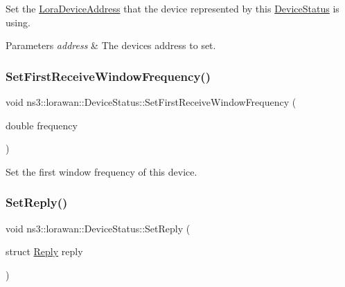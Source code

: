 Set the \hyperlink{classns3_1_1lorawan_1_1LoraDeviceAddress}{Lora\+Device\+Address} that the device represented by this \hyperlink{classns3_1_1lorawan_1_1DeviceStatus}{Device\+Status} is using.


\begin{DoxyParams}{Parameters}
{\em address} & The device\textquotesingle{}s address to set. \\
\hline
\end{DoxyParams}
\mbox{\label{classns3_1_1lorawan_1_1DeviceStatus_a27f4dfe68d8361e4835c50865aaf7325}} 
\subsubsection{\texorpdfstring{Set\+First\+Receive\+Window\+Frequency()}{SetFirstReceiveWindowFrequency()}}
{\footnotesize\ttfamily void ns3\+::lorawan\+::\+Device\+Status\+::\+Set\+First\+Receive\+Window\+Frequency (\begin{DoxyParamCaption}\item[{double}]{frequency }\end{DoxyParamCaption})}

Set the first window frequency of this device. \mbox{\label{classns3_1_1lorawan_1_1DeviceStatus_a10001b2464375197ac57462323ef2766}} 
\subsubsection{\texorpdfstring{Set\+Reply()}{SetReply()}}
{\footnotesize\ttfamily void ns3\+::lorawan\+::\+Device\+Status\+::\+Set\+Reply (\begin{DoxyParamCaption}\item[{struct \hyperlink{structns3_1_1lorawan_1_1DeviceStatus_1_1Reply}{Reply}}]{reply }\end{DoxyParamCaption})}

